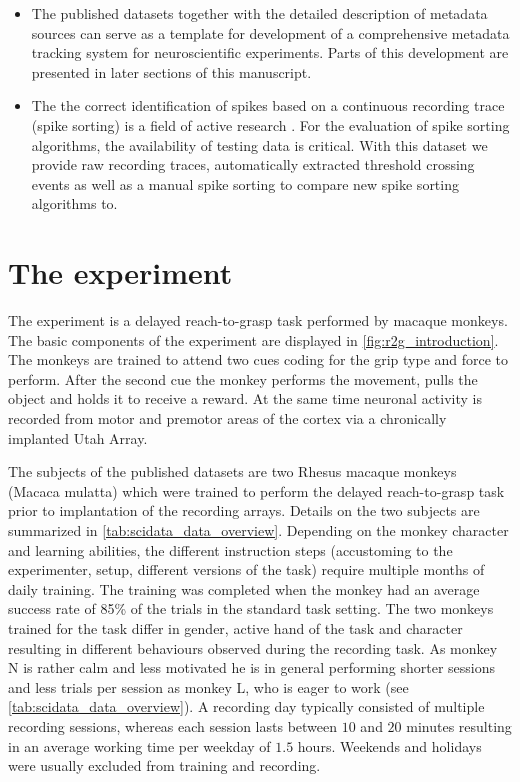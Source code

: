 \begin{itemize}
 \item The published datasets together with the detailed description of metadata sources can serve as a template for development of a comprehensive metadata tracking system for neuroscientific experiments. Parts of this development are presented in later sections of this manuscript.
 \item The the correct identification of spikes based on a continuous recording trace (spike sorting) is a field of active research \citep{Rey_2015, Lefebvre_2016, Sukiban_2019}. For the evaluation of spike sorting algorithms, the availability of testing data is critical. With this dataset we provide raw recording traces, automatically extracted threshold crossing events as well as a manual spike sorting to compare new spike sorting algorithms to.
\end{itemize}


\section{The experiment}
The experiment is a delayed reach-to-grasp task performed by macaque monkeys. The basic components of the experiment are displayed in \cref{fig:r2g_introduction}. The monkeys are trained to attend two cues coding for the grip type and force to perform. After the second cue the monkey performs the movement, pulls the object and holds it to receive a reward. At the same time neuronal activity is recorded from motor and premotor areas of the cortex via a chronically implanted Utah Array. 

The subjects of the published datasets are two Rhesus macaque monkeys (Macaca mulatta) which were trained to perform the delayed reach-to-grasp task prior to implantation of the recording arrays. Details on the two subjects are summarized in \cref{tab:scidata_data_overview}. Depending on the monkey character and learning abilities, the different instruction steps (accustoming to the experimenter, setup, different versions of the task) require multiple months of daily training. The training was completed when the monkey had an average success rate of 85\% of the trials in the standard task setting.
The two monkeys trained for the task differ in gender, active hand of the task and character resulting in different behaviours observed during the recording task. As monkey N is rather calm and less motivated he is in general performing shorter sessions and less trials per session as monkey L, who is eager to work (see \cref{tab:scidata_data_overview}). A recording day typically consisted of multiple recording sessions, whereas each session lasts between $10$ and $20$ minutes resulting in an average working time per weekday of $1.5$ hours. Weekends and holidays were usually excluded from training and recording.

